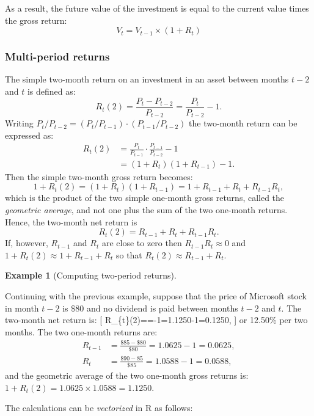 \documentclass[
  letterpaper,
  DIV=11,
  numbers=noendperiod]{scrreprt}
\theoremstyle{definition}
\theoremstyle{definition}
\newtheorem{example}{Example}[chapter]
\theoremstyle{remark}
\begin{document}
As a result, the future value of the investment is equal to the current
value times the gross return: \[V_{t} = V_{t-1} \times (1 + R_{t})\]

\hypertarget{multi-period-returns}{%
\subsubsection{Multi-period returns}\label{multi-period-returns}}

 The simple two-month return on an
investment in an asset between months \(t-2\) and \(t\) is defined as:
\[R_{t}(2)=\frac{P_{t}-P_{t-2}}{P_{t-2}}=\frac{P_{t}}{P_{t-2}}-1.\]
Writing \(P_{t}/P_{t-2}=(P_{t}/P_{t-1})\cdot (P_{t-1}/P_{t-2})\) the
two-month return can be expressed as: \begin{align*}
R_{t}(2) & =\frac{P_{t}}{P_{t-1}}\cdot\frac{P_{t-1}}{P_{t-2}}-1\\
 & =(1+R_{t})(1+R_{t-1})-1.
\end{align*} Then the simple two-month gross return becomes:
\[1+R_{t}(2)=(1+R_{t})(1+R_{t-1})=1+R_{t-1}+R_{t}+R_{t-1}R_{t},\] which
is the product of the two simple one-month gross returns, called the
\emph{geometric average}, and not one plus the sum of the two one-month
returns. Hence, the two-month net return is
\[R_{t}(2)=R_{t-1}+R_{t}+R_{t-1}R_{t}.\] If, however, \(R_{t-1}\) and
\(R_{t}\) are close to zero then \(R_{t-1}R_{t}\approx0\) and
\(1+R_{t}(2)\approx1+R_{t-1}+R_{t}\) so that
\(R_{t}(2)\approx R_{t-1}+R_{t}\).

\begin{example}[Computing two-period
returns]\protect\hypertarget{exm-example0107}{}\label{exm-example0107}

Continuing with the previous example, suppose that the price of
Microsoft stock in month \(t-2\) is \(\$80\) and no dividend is paid
between months \(t-2\) and \(t.\) The two-month net return is: {[}
R\_\{t\}(2)==-1=1.1250-1=0.1250,
{]} or 12.50\% per two months. The two one-month returns are:
\begin{align*}
R_{t-1} & =\frac{\$85-\$80}{\$80}=1.0625-1=0.0625,\\
R_{t} & =\frac{\$90-85}{\$85}=1.0588-1=0.0588,
\end{align*} and the geometric average of the two one-month gross
returns is: \(1+R_{t}(2)=1.0625 \times 1.0588=1.1250.\)

The calculations can be \emph{vectorized} in R as follows:

\end{example}
\end{document}
